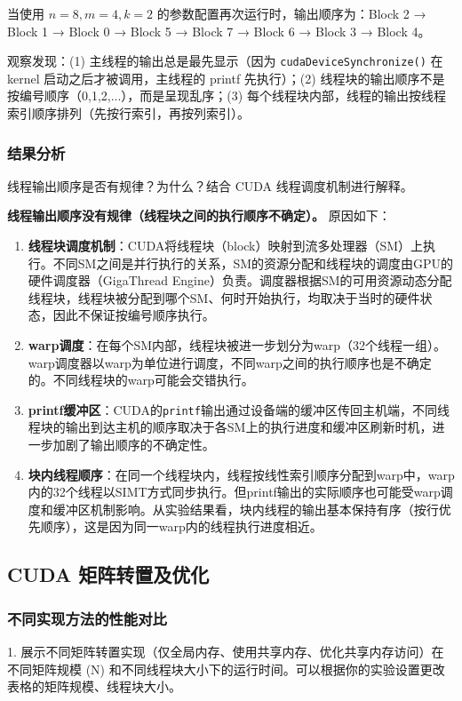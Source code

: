 \documentclass{SYSUReport}
\begin{document}
当使用 $n=8, m=4, k=2$ 的参数配置再次运行时，输出顺序为：Block 2 → Block 1 → Block 0 → Block 5 → Block 7 → Block 6 → Block 3 → Block 4。

观察发现：(1) 主线程的输出总是最先显示（因为 \texttt{cudaDeviceSynchronize()} 在 kernel 启动之后才被调用，主线程的 printf 先执行）；(2) 线程块的输出顺序不是按编号顺序（0,1,2,...），而是呈现乱序；(3) 每个线程块内部，线程的输出按线程索引顺序排列（先按行索引，再按列索引）。

\subsubsection{结果分析}

线程输出顺序是否有规律？为什么？结合 CUDA 线程调度机制进行解释。

\textbf{线程输出顺序没有规律（线程块之间的执行顺序不确定）。} 原因如下：

\begin{enumerate}
    \item \textbf{线程块调度机制}：CUDA将线程块（block）映射到流多处理器（SM）上执行。不同SM之间是并行执行的关系，SM的资源分配和线程块的调度由GPU的硬件调度器（GigaThread Engine）负责。调度器根据SM的可用资源动态分配线程块，线程块被分配到哪个SM、何时开始执行，均取决于当时的硬件状态，因此不保证按编号顺序执行。

    \item \textbf{warp调度}：在每个SM内部，线程块被进一步划分为warp（32个线程一组）。warp调度器以warp为单位进行调度，不同warp之间的执行顺序也是不确定的。不同线程块的warp可能会交错执行。

    \item \textbf{printf缓冲区}：CUDA的\texttt{printf}输出通过设备端的缓冲区传回主机端，不同线程块的输出到达主机的顺序取决于各SM上的执行进度和缓冲区刷新时机，进一步加剧了输出顺序的不确定性。

    \item \textbf{块内线程顺序}：在同一个线程块内，线程按线性索引顺序分配到warp中，warp内的32个线程以SIMT方式同步执行。但printf输出的实际顺序也可能受warp调度和缓冲区机制影响。从实验结果看，块内线程的输出基本保持有序（按行优先顺序），这是因为同一warp内的线程执行进度相近。
\end{enumerate}

\subsection{CUDA 矩阵转置及优化}
\subsubsection{不同实现方法的性能对比}
1. 展示不同矩阵转置实现（仅全局内存、使用共享内存、优化共享内存访问）在不同矩阵规模 (N) 和不同线程块大小下的运行时间。可以根据你的实验设置更改表格的矩阵规模、线程块大小。
\end{document}
